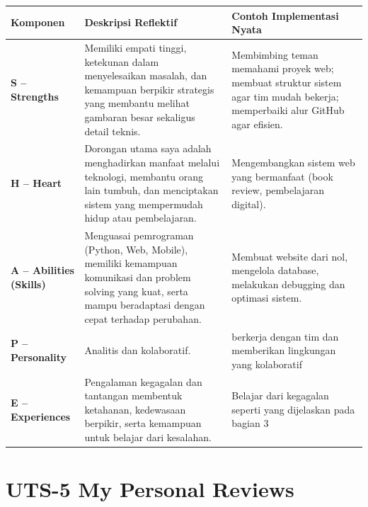 \documentclass[
  letterpaper,
  DIV=11,
  numbers=noendperiod]{scrreprt}
\begin{document}
\begin{longtable}[]{@{}
  >{\raggedright\arraybackslash}p{}
  >{\raggedright\arraybackslash}p{}
  >{\raggedright\arraybackslash}p{}@{}}
\toprule\noalign{}
\begin{minipage}[b]{\linewidth}\raggedright
\textbf{Komponen}
\end{minipage} & \begin{minipage}[b]{\linewidth}\raggedright
\textbf{Deskripsi Reflektif}
\end{minipage} & \begin{minipage}[b]{\linewidth}\raggedright
\textbf{Contoh Implementasi Nyata}
\end{minipage} \\
\midrule\noalign{}
\endhead
\bottomrule\noalign{}
\endlastfoot
\textbf{S -- Strengths} & Memiliki empati tinggi, ketekunan dalam
menyelesaikan masalah, dan kemampuan berpikir strategis yang membantu
melihat gambaran besar sekaligus detail teknis. & Membimbing teman
memahami proyek web; membuat struktur sistem agar tim mudah bekerja;
memperbaiki alur GitHub agar efisien. \\
\textbf{H -- Heart} & Dorongan utama saya adalah menghadirkan manfaat
melalui teknologi, membantu orang lain tumbuh, dan menciptakan sistem
yang mempermudah hidup atau pembelajaran. & Mengembangkan sistem web
yang bermanfaat (book review, pembelajaran digital). \\
\textbf{A -- Abilities (Skills)} & Menguasai pemrograman (Python, Web,
Mobile), memiliki kemampuan komunikasi dan problem solving yang kuat,
serta mampu beradaptasi dengan cepat terhadap perubahan. & Membuat
website dari nol, mengelola database, melakukan debugging dan optimasi
sistem. \\
\textbf{P -- Personality} & Analitis dan kolaboratif. & berkerja dengan
tim dan memberikan lingkungan yang kolaboratif \\
\textbf{E -- Experiences} & Pengalaman kegagalan dan tantangan membentuk
ketahanan, kedewasaan berpikir, serta kemampuan untuk belajar dari
kesalahan. & Belajar dari kegagalan seperti yang dijelaskan pada bagian
3 \\
\end{longtable}


\chapter{UTS-5 My Personal Reviews}\label{uts-5-my-personal-reviews}
\end{document}
